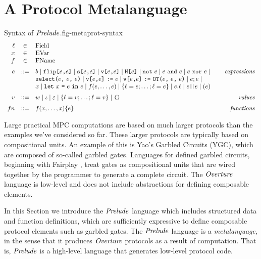 \section{A Protocol Metalanguage}
\label{section-metalang}

\begin{fpfig}[t]{Syntax of $\mathit{Prelude}$.}{fig-metaprot-syntax}
$$
\begin{array}{rcl@{\hspace{8mm}}r}
\flab &\in& \mathrm{Field}\\
x &\in& \mathrm{EVar}\\
f &\in& \mathrm{FName}\\[2mm]
e &::=& b \mid \flip{e}{e} \mid \secret{e}{e} \mid \view{e}{e} \mid \oracle{e} \mid \enot\ e \mid e\ \eand\ e \mid e\ \exor\ e \mid & \textit{expressions}\\[0mm]
& & \select{e}{e}{e} \mid 
\send{\view{e}{e}}{e} \mid \send{\view{e}{e}}{\OT{e}{e}{e}} \mid e;e \mid \\[0mm]
& & x \mid \elet{x}{e}{e} \mid f(e,\ldots,e) \mid \{ \flab = e; \ldots; \flab = e \}
\mid e.\flab \mid e\concat e \mid (e) \\[2mm]
v &::=& w \mid \cid \mid \be \mid \{ \flab = v;\ldots;\flab = v \} 
\mid \ttt{()} & \textit{values}\\[2mm]
{fn} &::=& f(x,\ldots,x) \{ e \} & \textit{functions}
\end{array}
$$
\end{fpfig}

Large practical MPC computations are based on much larger protocols
than the examples we've considered so far. These larger protocols are
typically based on compositional units. An example of this is Yao's
Garbled Circuits (YGC), which are composed of so-called garbled gates.
Languages for defined garbled circuits, beginning with Fairplay \cite{269581},
treat gates as compositional units that are wired together by the programmer
to generate a complete circuit. The $\mathit{Overture}$ language is low-level
and does not include abstractions for defining composable elements. 

In this Section we introduce the $\mathit{Prelude}$ language which includes
structured data and function definitions, which are sufficiently
expressive to define composable protocol elements such as garbled
gates. The $\mathit{Prelude}$ language is a \emph{metalanguage}, in the sense
that it produces $\mathit{Overture}$ protocols as a result of computation. That
is, $\mathit{Prelude}$ is a high-level language that generates low-level
protocol code.

